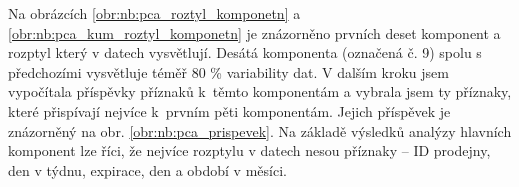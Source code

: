 Na obrázcích \ref*{obr:nb:pca_roztyl_komponetn} a \ref*{obr:nb:pca_kum_roztyl_komponetn} je znázorněno prvních deset komponent a rozptyl který v datech vysvětlují. 
Desátá komponenta (označená č. 9) spolu s předchozími vysvětluje téměř 80 \% variability dat. V dalším kroku jsem vypočítala příspěvky příznaků k~těmto komponentám a vybrala jsem ty příznaky, které přispívají nejvíce k~prvním pěti komponentám. Jejich příspěvek je znázorněný na obr. \ref*{obr:nb:pca_prispevek}. Na základě výsledků analýzy hlavních komponent lze říci, že nejvíce rozptylu v datech nesou příznaky -- ID prodejny, den v týdnu, expirace, den a období v měsíci.

